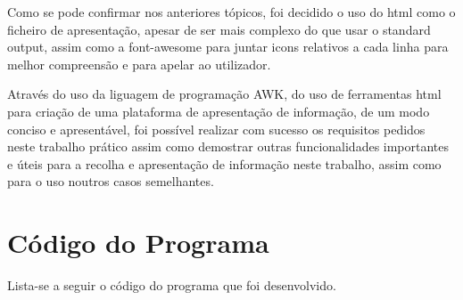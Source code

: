 \documentclass{report}
\begin{document}
Como se pode confirmar nos anteriores tópicos, foi decidido o uso do html como o ficheiro de apresentação, apesar de ser mais complexo do que usar o standard output, assim como a font-awesome para juntar icons relativos a cada linha para melhor compreensão e para apelar ao utilizador.\par

Através do uso da liguagem de programação AWK, do uso de ferramentas html para criação de uma plataforma de apresentação de informação, de um modo conciso e apresentável, foi possível realizar com sucesso os requisitos pedidos neste trabalho prático assim como demostrar outras funcionalidades importantes e úteis para a recolha e apresentação de informação neste trabalho, assim como para o uso noutros casos semelhantes.


\appendix 
\chapter{Código do Programa}

Lista-se a seguir o código  do programa  que foi desenvolvido.




\end{document}
